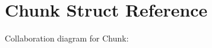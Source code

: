 \hypertarget{structChunk}{}\section{Chunk Struct Reference}
\label{structChunk}


Collaboration diagram for Chunk\+:
